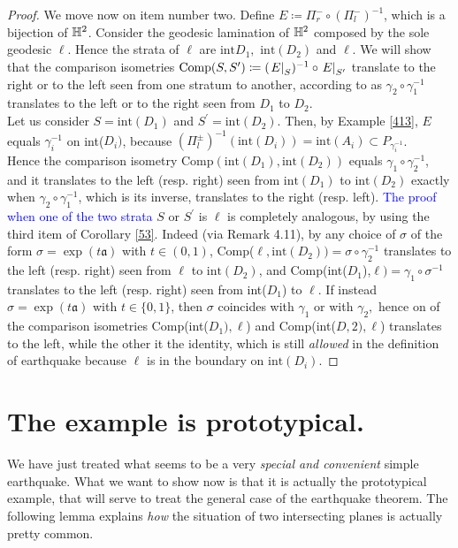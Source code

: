 \begin{proof}
 We move now on item number two. Define $E\coloneqq\Pi_r^-\circ(\Pi_l^-)^{-1}$, which is a bijection of $\mathbb{H}^2$. Consider the geodesic lamination of $\mathbb{H}^2$ composed by the sole geodesic $\ell.$ Hence the strata of $\ell$ are $\text{int}{D_1},$ $\text{int}(D_2)$ and $\ell$. We will show that the comparison isometries $\text{Comp}(S,S^{\prime})\coloneqq(\left.E\right|_{S})^{-1}\circ\left.E\right|_{S^{\prime}}$ translate to the right or to the left seen from one stratum to another, according to as $ \gamma_2\circ\gamma_1^{-1}$ translates to the left or to the right seen from $D_1$ to $D_2$.\\
 Let us consider $S=\text{int}(D_1)$ and $S^{\prime}=\text{int}(D_2)$. Then, by Example \ref{413}, $E$ equals $\gamma_i^{-1}$ on int($D_i)$, because $(\Pi_l^\pm)^{-1}(\text{int}(D_i))=\text{int}(A_i)\subset P_{\gamma_i^{-1}}$. \\
 Hence the comparison isometry $\text{Comp}(\text{int}(D_1),\text{int}(D_2))$ equals $\gamma_1\circ\gamma_2^{-1}$, and it translates to the left (resp. right) seen from $\text{int}(D_1)$ to $\text{int}(D_2)$ exactly when $\gamma_2\circ\gamma_1^{-1}$, which is its inverse, translates to the right (resp. left).  
 \textcolor{blue}{The proof when one of the two strata} $S$ or $S^{\prime}$ is $\ell$ is completely analogous, by using the third item of Corollary \ref{53}. Indeed (via Remark 4.11), by any choice of $\sigma$ of the form $\sigma=\exp(t\mathfrak{a})$ with $t\in(0,1)$, Comp($\ell,\text{int}(D_2))=\sigma\circ\gamma_2^{-1}$ translates to the left (resp. right) seen from $\ell$ to $\text{int}(D_2)$, and Comp(int($D_1$),$\ell)=\gamma_1\circ\sigma^{-1}$ translates to the left (resp. right) seen from int($D_1$) to $\ell.$ If instead $\sigma=\exp(t\mathfrak{a})$ with $t\in\{0,1\}$, then $\sigma$ coincides with $\gamma_1$ or with $\gamma_2,$ hence on of the comparison isometries Comp(int($D_1),\ell$) and Comp(int($D,2),\ell$) translates to the left, while the other it the identity, which is still \textit{allowed} in the definition of earthquake because $\ell$ is in the boundary on $\text{int}(D_i)$.
\end{proof}

\section{The example is prototypical.} We have just treated what seems to be a very \textit{special and convenient} simple earthquake. What we want to show now is that it is actually the prototypical example, that will serve to treat the general case of the earthquake theorem. The following lemma explains \textit{how} the situation of two intersecting planes is actually pretty common. 

